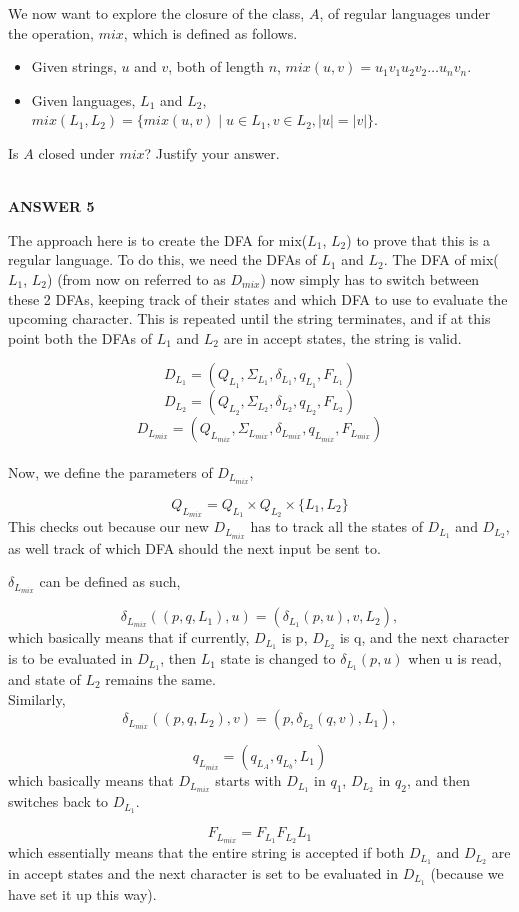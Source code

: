 \documentclass[addpoints]{exam}
\begin{document}
\begin{questions}
\question[5] We now want to explore the closure of the class, $A$, of regular languages under the operation, $mix$, which is defined as follows.
  \begin{itemize}
  \item Given strings, $u$ and $v$, both of length $n$, $mix(u,v) = u_1v_1u_2v_2\ldots u_nv_n$.
  \item Given languages, $L_1$ and $L_2$, $mix(L_1,L_2) = \{mix(u,v) \mid u\in L_1, v\in L_2, |u| = |v|\}$.
  \end{itemize}
  Is $A$ closed under $mix$? Justify your answer.
\\ \\ 
\begin{center}
      \textbf{ANSWER 5 }
\end{center} 

The approach here is to create the DFA for mix($L_1$, $L_2$) to prove that this is a regular language. To do this, we need the DFAs of $L_{1}$ and $L_{2}$. The DFA of mix($L_1$, $L_2$) (from now on referred to as $D_{mix}$) now simply has to switch between these 2 DFAs, keeping track of their states and which DFA to use to evaluate the upcoming character. This is repeated until the string terminates, and if at this point both the DFAs of $L_{1}$ and $L_{2}$ are in accept states, the string is valid.

\[D_{L_1} = (Q_{L_1}, \Sigma_{L_1}, \delta_{L_1}, q_{L_1}, F_{L_1})\]
\[D_{L_2} = (Q_{L_2}, \Sigma_{L_2}, \delta_{L_2}, q_{L_2}, F_{L_2})\]
\[D_{L_{mix}} = (Q_{L_{mix}}, \Sigma_{L_{mix}}, \delta_{L_{mix}}, q_{L_{mix}}, F_{L_{mix}})\]
\\ 

Now, we define the parameters of $D_{L_{mix}}$,

\[Q_{L_{mix}} = Q_{L_1} \times Q_{L_2} \times \{L_1, L_2\}\]
This checks out because our new $D_{L_{mix}}$ has to track all the states of $D_{L_1}$ and $D_{L_2}$, as well track of which DFA should the next input be sent to.

$\delta_{L_{mix}}$ can be defined as such,

\[\delta_{L_{mix}}((p, q, L_1), u) = (\delta_{L_{1}}(p, u), v, L_{2}),\] which basically means that if currently, $D_{L_1}$ is p, $D_{L_2}$ is q, and the next character is to be evaluated in $D_{L_1}$, then $L_1$ state is changed to $\delta_{L_{1}}(p, u)$ when u is read, and state of $L_2$ remains the same. \\Similarly,
\[\delta_{L_{mix}}((p, q, L_2), v) = (p,\delta_{L_{2}}(q, v), L_{1}),\]

\[q_{L_{mix}} = (q_{L_{A}}, q_{L_{b}}, L_1)\]
which basically means that $D_{L_{mix}}$ starts with $D_{L_{1}}$ in $q_1$, $D_{L_{2}}$ in $q_2$, and then switches back to $D_{L_{1}}$.

\[F_{L_{mix}} = F_{L_1} F_{L_2} L_{1}\]
which essentially means that the entire string is accepted if both $D_{L_1}$ and $D_{L_2}$ are in accept states and the next character is set to be evaluated in $D_{L_1}$ (because we have set it up this way).



  
\end{questions}
\end{document}
